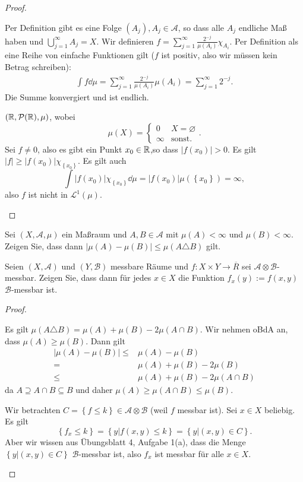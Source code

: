\begin{proof}
	\begin{parts}
	\item Per Definition gibt es eine Folge $(A_j),A_j\in \mathcal{A}$, so dass alle $A_j$ endliche Maß haben und $\bigcup_{j=1} ^\infty A_j=X$. Wir definieren $f=\sum_{j=1}^\infty \frac{2^{-j}}{\mu(A_i)}\chi_{A_i}$. Per Definition als eine Reihe von einfache Funktionen gilt ($f$ ist positiv, also wir müssen kein Betrag schreiben):
		\begin{align*}
			\int f\dd{\mu}=\sum_{j=1}^\infty \frac{2^{-j}}{\mu(A_i)}\mu(A_i)=\sum_{j=1}^\infty 2^{-j}.
		\end{align*}
		Die Summe konvergiert und ist endlich.
	\item $(\mathbb{R}, \mathcal{P}(\mathbb{R}), \mu)$, wobei
		\[
		\mu(X)=\begin{cases}
			0 & X=\varnothing\\
			\infty & \text{sonst.}
		\end{cases}
		.\] 
		Sei $f\neq 0$, also es gibt ein Punkt $x_0\in \mathbb{R}$,so dass $|f(x_0)|>0$. Es gilt $|f|\ge |f(x_0)|\chi_{\left\{ x_0 \right\} }$. Es gilt auch
		\[
			\int |f(x_0)|\chi_{\left\{ x_0 \right\} }\dd{\mu}=|f(x_0)|\mu(\left\{ x_0 \right\} )=\infty
		,\]
		also $f$ ist nicht in $\mathcal{L}^1(\mu)$.\qedhere 
	\end{parts}
\end{proof}
\begin{Problem}
\begin{parts}
\item Sei $(X,\mathcal{A},\mu)$ ein Maßraum und $A,B\in \mathcal{A}$ mit $\mu(A)<\infty$ und $\mu(B)<\infty$. Zeigen Sie, dass dann $|\mu(A)-\mu(B)|\le\mu(A\triangle B)$ gilt.
\item Seien $(X,\mathcal{A})$ und $(Y,\mathcal{B})$ messbare Räume und $f:X\times Y\to \overline{R}$ sei $\mathcal{A}\otimes \mathcal{B}$-messbar. Zeigen Sie, dass dann f\"{u}r jedes $x\in X$ die Funktion $f_x(y):=f(x,y)$ $\mathcal{B}$-messbar ist.
\end{parts}
\end{Problem}
\begin{proof}
	\begin{parts}
	\item Es gilt $\mu(A\triangle B)=\mu(A)+\mu(B)-2\mu(A\cap B)$. Wir nehmen oBdA an, dass $\mu(A)\ge \mu(B)$. Dann gilt
		\begin{align*}
			|\mu(A)-\mu(B)|\le& \mu(A)-\mu(B)\\
			=&\mu(A)+\mu(B)-2\mu\left( B \right) \\
			\le& \mu(A)+\mu(B)-2\mu(A\cap B)
		\end{align*}
		da $A\supseteq A\cap B\subseteq B$ und daher $\mu(A)\ge \mu(A\cap B)\le \mu(B)$.
	\item Wir betrachten $C=\left\{ f\le k \right\} \in \mathcal{A}\otimes \mathcal{B}$ (weil $f$ messbar ist). Sei $x\in X$ beliebig. Es gilt
		\[
		\left\{ f_x\le k \right\} =\left\{ y|f(x,y)\le k \right\}=\left\{ y|(x,y)\in C \right\}  
		.\] 
		Aber wir wissen aus Übungsblatt 4, Aufgabe 1(a), dass die Menge $\left\{ y|(x,y)\in C \right\} $ $\mathcal{B}$-messbar ist, also $f_x$ ist messbar f\"{u}r alle $x\in X$.\qedhere
	\end{parts}
\end{proof}
